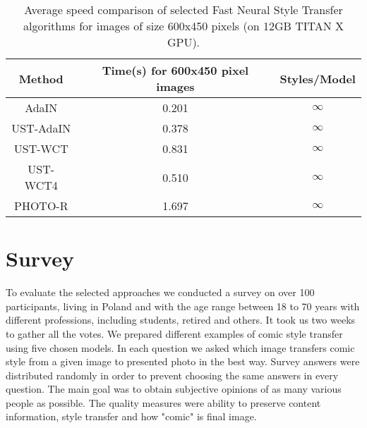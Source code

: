 \documentclass{llncs}
\begin{document}
\begin{table}[t]
\centering
\bgroup
\def\arraystretch{1.1}
\setlength\tabcolsep{2.6em}
\caption{Average speed comparison of selected Fast Neural Style Transfer algorithms for images of size 600x450 pixels (on 12GB TITAN X GPU).\label{speed:results}}
\begin{tabular}{| c | c | c |}
\hline
Method&Time(s) for 600x450 pixel images&Styles/Model\\
\hline
AdaIN&0.201&$\infty$\\
\hline

UST-AdaIN&0.378&$\infty$\\
\hline

UST-WCT&0.831&$\infty$\\
\hline

UST-WCT4&0.510&$\infty$\\
\hline

PHOTO-R&1.697&$\infty$\\
\hline

\end{tabular}

\egroup
\end{table}


\section{Survey}

To evaluate the selected approaches we conducted a survey on over 100 participants, living in Poland and with the age range between 18 to 70 years with different professions, including students, retired and others. %
It took us two weeks to gather all the votes. We prepared different examples of comic style transfer using five chosen models. In each question we asked which image transfers comic style from a given image to presented photo in the best way. Survey answers were distributed randomly in order to prevent choosing the same answers in every question. The main goal was to obtain subjective opinions of as many various people as possible. The quality measures were ability to preserve content information, style transfer and how "comic" is final image. 

\end{document}
